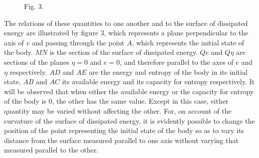 \documentclass[11pt]{article}
\begin{document}
\begin{figure}[htbp]
\centering
{}
\caption{Fig. 3.}
\end{figure}

The relations of these quantities to one another and to the surface of dissipated energy are illustrated by figure 3, which represents a plane perpendicular to the axis of $v$ and passing through the point $A$, which represents the initial state of the body. $MN$ is the section of the surface of dissipated energy. $Qe$ and $Q\eta$ are sections of the planes $\eta=0$ and $e=0$, and therefore parallel to the axes of $e$ and $\eta$ respectively. $AD$ and $AE$ are the energy and entropy of the body in its initial state, $AB$ and $AC$ its available energy and its capacity for entropy respectively. It will be observed that when either the available energy or the capacity for entropy of the body is $0$, the other has the same value. Except in this case, either quantity may be varied without affecting the other. For, on account of the curvature of the surface of dissipated energy, it is evidently possible to change the position of the point representing the initial state of the body so as to vary its distance from the surface measured parallel to one axis without varying that measured parallel to the other.
\end{document}
